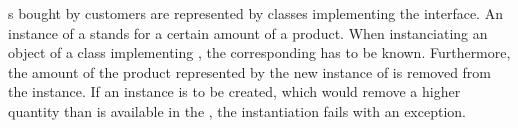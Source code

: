 s bought by customers are represented by classes implementing the  interface.
An instance of a  stands for a certain amount of a product.
When instanciating an object of a class implementing , the corresponding  has to be known.
Furthermore, the amount of the product represented by the new instance of  is removed from the  instance.
If an instance is to be created, which would remove a higher quantity than is available in the , the instantiation fails with an exception.

